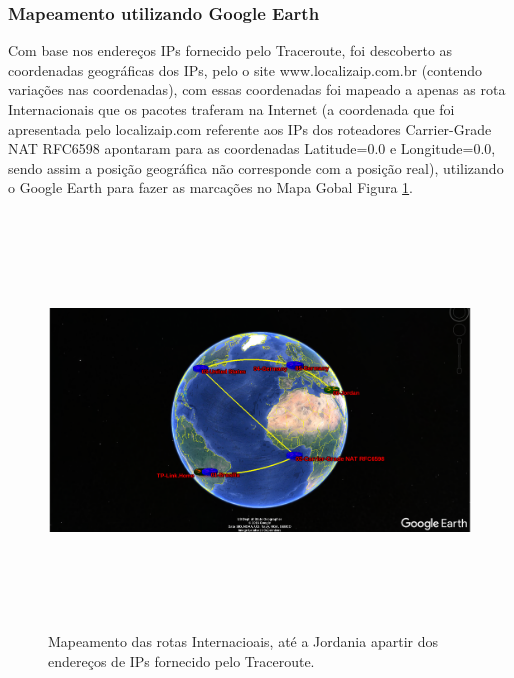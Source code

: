 \documentclass[
	article,			%
	11pt,				%
	oneside,			%
	a4paper,			%
	english,			%
	brazil,				%
	sumario=tradicional
	]{abntex2}
\begin{document}
\subsubsection{Mapeamento utilizando Google Earth }
	Com base nos endereços IPs fornecido pelo Traceroute, foi descoberto as coordenadas geográficas dos IPs, pelo o site www.localizaip.com.br (contendo variaç\~oes nas coordenadas), com essas coordenadas foi mapeado a apenas as rota Internacionais que os pacotes traferam na Internet (a coordenada que foi apresentada pelo localizaip.com referente aos IPs dos roteadores Carrier-Grade NAT RFC6598 apontaram para as coordenadas Latitude=0.0 e Longitude=0.0, sendo assim a posição geográfica não corresponde com a posição real), utilizando o Google Earth para fazer as marcações no Mapa Gobal Figura \ref{google-earth}.
\begin{figure}[H]
	\centering
	\includegraphics[width=15cm,height=11cm]{./google-earh.png}
	\caption{Mapeamento das rotas Internacioais, até a Jordania apartir dos endereços de IPs fornecido pelo Traceroute.}
	\label{google-earth}
\end{figure}

% 

\end{document}

